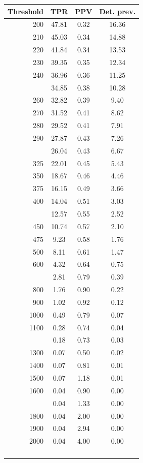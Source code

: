 \documentclass[12pt]{article}
\begin{document}
\begin{minipage}{0.5\textwidth}\small
\begin{tabular}{rccc}
\toprule
\textbf{Threshold} & \textbf{TPR} 
& \textbf{PPV} & \textbf{Det. prev.} \\
\midrule 
   200 & 47.81 & 0.32 & 16.36 \\ 
   210 & 45.03 & 0.34 & 14.88 \\ 
   220 & 41.84 & 0.34 & 13.53 \\ 
   230 & 39.35 & 0.35 & 12.34 \\ 
   240 & 36.96 & 0.36 & 11.25 \\  \addlinespace
   250 & 34.85 & 0.38 & 10.28 \\ 
   260 & 32.82 & 0.39 & 9.40 \\ 
   270 & 31.52 & 0.41 & 8.62 \\ 
   280 & 29.52 & 0.41 & 7.91 \\ 
   290 & 27.87 & 0.43 & 7.26 \\  \addlinespace
   300 & 26.04 & 0.43 & 6.67 \\ 
   325 & 22.01 & 0.45 & 5.43 \\ 
   350 & 18.67 & 0.46 & 4.46 \\ 
   375 & 16.15 & 0.49 & 3.66 \\ 
   400 & 14.04 & 0.51 & 3.03 \\  \addlinespace
   425 & 12.57 & 0.55 & 2.52 \\ 
   450 & 10.74 & 0.57 & 2.10 \\ 
   475 & 9.23 & 0.58 & 1.76 \\ 
   500 & 8.11 & 0.61 & 1.47 \\ 
   600 & 4.32 & 0.64 & 0.75 \\  \addlinespace
   700 & 2.81 & 0.79 & 0.39 \\ 
   800 & 1.76 & 0.90 & 0.22 \\ 
   900 & 1.02 & 0.92 & 0.12 \\ 
  1000 & 0.49 & 0.79 & 0.07 \\ 
  1100 & 0.28 & 0.74 & 0.04 \\  \addlinespace
  1200 & 0.18 & 0.73 & 0.03 \\ 
  1300 & 0.07 & 0.50 & 0.02 \\ 
  1400 & 0.07 & 0.81 & 0.01 \\ 
  1500 & 0.07 & 1.18 & 0.01 \\ 
  1600 & 0.04 & 0.90 & 0.00 \\  \addlinespace
  1700 & 0.04 & 1.33 & 0.00 \\ 
  1800 & 0.04 & 2.00 & 0.00 \\ 
  1900 & 0.04 & 2.94 & 0.00 \\ 
  2000 & 0.04 & 4.00 & 0.00 \\ \\ \addlinespace \\ \\ \\
\bottomrule
\end{tabular}

\end{minipage}
\end{document}
